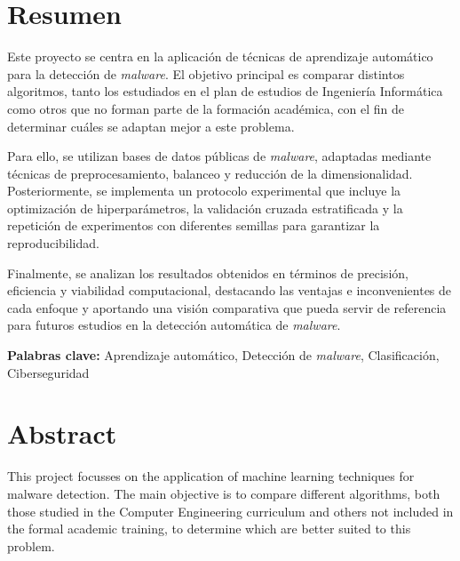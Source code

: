 \chapter*{Resumen}

Este proyecto se centra en la aplicación de técnicas de aprendizaje automático para la detección de \textit{malware}. El objetivo principal es comparar distintos algoritmos, tanto los estudiados en el plan de estudios de Ingeniería Informática como otros que no forman parte de la formación académica, con el fin de determinar cuáles se adaptan mejor a este problema.

\vspace{1em}

Para ello, se utilizan bases de datos públicas de \textit{malware}, adaptadas mediante técnicas de preprocesamiento, balanceo y reducción de la dimensionalidad. Posteriormente, se implementa un protocolo experimental que incluye la optimización de hiperparámetros, la validación cruzada estratificada y la repetición de experimentos con diferentes semillas para garantizar la reproducibilidad.

\vspace{1em}

Finalmente, se analizan los resultados obtenidos en términos de precisión, eficiencia y viabilidad computacional, destacando las ventajas e inconvenientes de cada enfoque y aportando una visión comparativa que pueda servir de referencia para futuros estudios en la detección automática de \textit{malware}.

\vspace{2em}

\textbf{Palabras clave:} Aprendizaje automático, Detección de \textit{malware}, Clasificación, Ciberseguridad

\chapter*{Abstract}

This project focusses on the application of machine learning techniques for malware detection. The main objective is to compare different algorithms, both those studied in the Computer Engineering curriculum and others not included in the formal academic training, to determine which are better suited to this problem.

